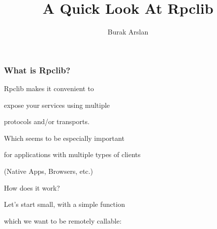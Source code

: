 \documentclass{beamer}
\title{A Quick Look At Rpclib}
\author{Burak Arslan}
\begin{document}
\begin{frame}
  \maketitle
\end{frame}

\begin{frame}
  \frametitle{What is Rpclib?}

  \LARGE
\begin{center}

  Rpclib makes it convenient to

  \bigskip

  expose your services using multiple

  \bigskip

  protocols and/or transports.

\end{center}


\end{frame}


\begin{frame}
\LARGE
\begin{center}

  Which seems to be especially important

  \bigskip

  for applications with multiple types of clients

  \large

  \bigskip

  (Native Apps, Browsers, etc.)

\end{center}

\end{frame}

\begin{frame}
\Huge
\begin{center}

  How does it work?

\end{center}

\end{frame}

\begin{frame}[fragile]
  \LARGE
\begin{center}

  Let's start small, with a simple function

  \bigskip

  which we want to be remotely callable:
\end{center}
\end{frame}
\end{document}
